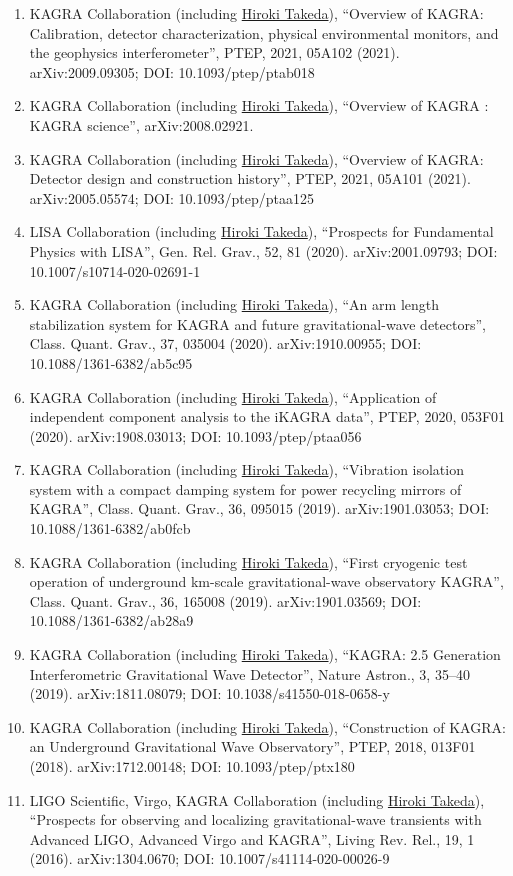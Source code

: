 \documentclass[uplatex, 12pt]{article}
\begin{document}
\begin{enumerate}
\item KAGRA Collaboration (including \uline{Hiroki Takeda}), “Overview of KAGRA: Calibration, detector characterization, physical environmental monitors, and the geophysics interferometer”, PTEP, 2021, 05A102 (2021). arXiv:2009.09305; DOI: 10.1093/ptep/ptab018
\item KAGRA Collaboration (including \uline{Hiroki Takeda}), “Overview of KAGRA : KAGRA science”, arXiv:2008.02921.
\item KAGRA Collaboration (including \uline{Hiroki Takeda}), “Overview of KAGRA: Detector design and construction history”, PTEP, 2021, 05A101 (2021). arXiv:2005.05574; DOI: 10.1093/ptep/ptaa125
\item LISA Collaboration (including \uline{Hiroki Takeda}), “Prospects for Fundamental Physics with LISA”, Gen. Rel. Grav., 52, 81 (2020). arXiv:2001.09793; DOI: 10.1007/s10714-020-02691-1
\item KAGRA Collaboration (including \uline{Hiroki Takeda}), “An arm length stabilization system for KAGRA and future gravitational-wave detectors”, Class. Quant. Grav., 37, 035004 (2020). arXiv:1910.00955; DOI: 10.1088/1361-6382/ab5c95
\item KAGRA Collaboration (including \uline{Hiroki Takeda}), “Application of independent component analysis to the iKAGRA data”, PTEP, 2020, 053F01 (2020). arXiv:1908.03013; DOI: 10.1093/ptep/ptaa056
\item KAGRA Collaboration (including \uline{Hiroki Takeda}), “Vibration isolation system with a compact damping system for power recycling mirrors of KAGRA”, Class. Quant. Grav., 36, 095015 (2019). arXiv:1901.03053; DOI: 10.1088/1361-6382/ab0fcb
\item KAGRA Collaboration (including \uline{Hiroki Takeda}), “First cryogenic test operation of underground km-scale gravitational-wave observatory KAGRA”, Class. Quant. Grav., 36, 165008 (2019). arXiv:1901.03569; DOI: 10.1088/1361-6382/ab28a9
\item KAGRA Collaboration (including \uline{Hiroki Takeda}), “KAGRA: 2.5 Generation Interferometric Gravitational Wave Detector”, Nature Astron., 3, 35--40 (2019). arXiv:1811.08079; DOI: 10.1038/s41550-018-0658-y
\item KAGRA Collaboration (including \uline{Hiroki Takeda}), “Construction of KAGRA: an Underground Gravitational Wave Observatory”, PTEP, 2018, 013F01 (2018). arXiv:1712.00148; DOI: 10.1093/ptep/ptx180
\item LIGO Scientific, Virgo, KAGRA Collaboration (including \uline{Hiroki Takeda}), “Prospects for observing and localizing gravitational-wave transients with Advanced LIGO, Advanced Virgo and KAGRA”, Living Rev. Rel., 19, 1 (2016). arXiv:1304.0670; DOI: 10.1007/s41114-020-00026-9

\end{enumerate}
\end{document}
